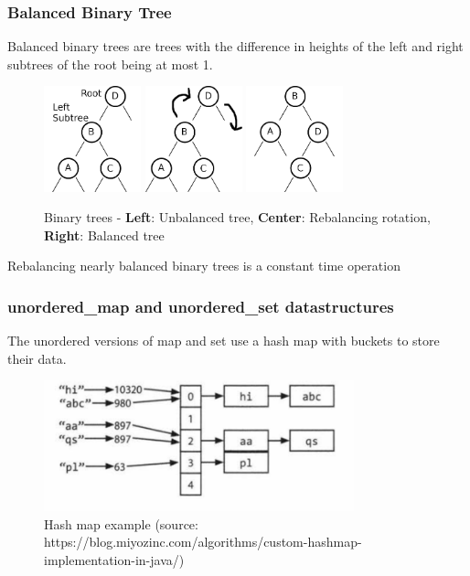 \documentclass{beamer}
\begin{document}
\begin{frame}
  \frametitle{Balanced Binary Tree}
  Balanced binary trees are trees with the difference in heights of the left and right subtrees
  of the root being at most 1.
  \begin{figure}[ht]
    \begin{multicols}{3}
      \includegraphics[width=0.25\textwidth]{figures/unbalanced_binary_tree.png}
      \includegraphics[width=0.25\textwidth]{figures/unbalanced_binary_tree_rotation.png}
      \includegraphics[width=0.25\textwidth]{figures/balanced_binary_tree.png}
    \end{multicols}
    \caption{Binary trees - {\bf Left}: Unbalanced tree, {\bf Center}: Rebalancing rotation,
      {\bf Right}: Balanced tree}
  \end{figure}
  Rebalancing nearly balanced binary trees is a constant time operation
\end{frame}

\begin{frame}
  \frametitle{unordered\_map and unordered\_set datastructures}
  The unordered versions of map and set use a hash map with buckets to store their data.
  \begin{figure}[ht]
    \includegraphics[width=0.8\textwidth]{figures/hash_map_buckets.png}
    \caption{Hash map example {\tiny (source: https://blog.miyozinc.com/algorithms/custom-hashmap-implementation-in-java/)}}
  \end{figure}
\end{frame}
\end{document}
